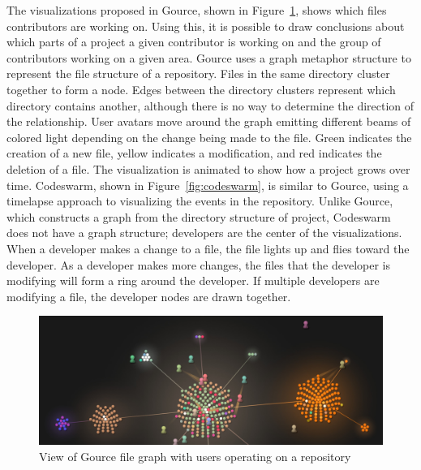 The visualizations proposed in Gource\cite{Caudwell2010}, shown in
Figure~\ref{fig:gource_view}, shows which files contributors are working
on.
Using this, it is possible to draw conclusions about which parts of a
project a given contributor is working on and the group of contributors
working on a given area. Gource uses a graph metaphor structure to
represent the file structure of a repository. Files in the same
directory cluster together to form a node. Edges between the directory
clusters represent which directory contains another, although there is
no way to determine the direction of the relationship.
User avatars move around the graph emitting different beams of colored
light depending on the change being made to the file.
Green indicates the creation of a new
file, yellow indicates a modification, and red indicates the deletion of
a file. The visualization is animated to show how a project grows over
time. Codeswarm\cite{ogawa09}, shown in Figure~\ref{fig:codeswarm}, is
similar to Gource, using a timelapse approach to visualizing the events
in the repository.
Unlike Gource, which constructs a graph from the directory structure
of project, Codeswarm does not have a graph structure;
developers are the center of the visualizations.
When a developer makes a change to a file, the file lights up and
flies toward the developer.
As a developer makes more changes, the files that the developer is
modifying will form a ring around the developer.
If multiple developers are modifying a file, the developer nodes
are drawn together.

\begin{figure}[htpb]
  \centering
  \includegraphics[width=0.8\linewidth]{./Figures/introduction/gource-linux.jpg}
  \caption{View of Gource file graph with users operating on a
    repository\cite{Caudwell2010}}
  \label{fig:gource_view}
\end{figure}

